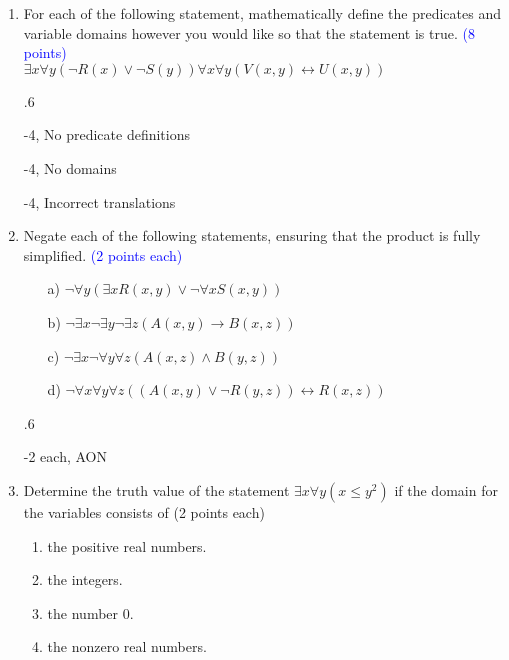 \documentclass{article}
\newcommand{\pt}[1]{\textcolor{blue}{(#1 points)}}
\newcommand{\pte}[1]{\textcolor{blue}{(#1 points each)}}
\newenvironment{rubric}
{
\par
\begin{spacing}{.6}
\begin{itshape}
\color{red}

}
{
\end{itshape}
\end{spacing}
\par
}
\begin{document}
\begin{enumerate}
    \begin{rubric}
    -4, AON
    \end{rubric}
    
    \item For each of the following statement, mathematically define the predicates and variable domains however you would like so that the statement is true. \pt 8 \\

    $\exists x \forall y (\neg R(x) \lor \neg S(y))$$\forall x \forall y (V(x,y) \longleftrightarrow U(x,y))$
    
    \begin{rubric}
    -4, No predicate definitions
    
    -4, No domains
    
    -4, Incorrect translations
    \end{rubric}
    
    \item Negate each of the following statements, ensuring that the product is fully simplified. \pte 2
    
    \begin{enumerate}
        \item[a)] $\neg  \forall y (\exists x R(x,y) \lor \neg \forall x S(x,y))$
        \item[b)] $\neg  \exists x \neg \exists y \neg \exists z (A(x,y) \rightarrow B(x,z))$ 
        \item[c)] $\neg  \exists x \neg \forall y \forall z (A(x,z) \land B(y,z))$
        \item[d)] $\neg \forall x \forall y \forall z ((A(x,y) \lor \neg R(y,z)) \longleftrightarrow R(x,z))$
    \end{enumerate}
    
    \begin{rubric}
    -2 each, AON
    \end{rubric}
    
    \item{Determine the truth value of the statement $\exists x \forall y (x \leq y^{2})$ if the domain for the variables consists of \hfill \color{blue}(2 points each)}\
    \begin{enumerate}
    \item the positive real numbers.
    \item the integers.
    \item the number 0.
    \item the nonzero real numbers.
    \end{enumerate}
    

\end{enumerate}
\end{document}
